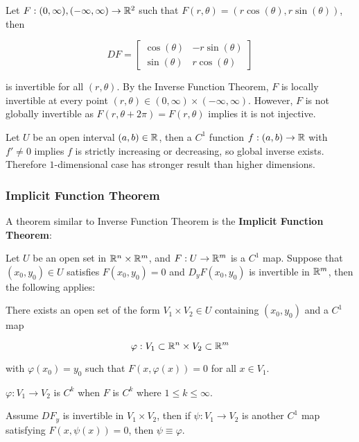 \documentclass[a4paper,12pt]{article}
\begin{document}
\begin{exm}
  Let $F:(0,\infty),(-\infty,\infty)\to\mathbb{R}^{2}$ such that $F(r,\theta)=(r\cos(\theta),r\sin(\theta))$, then
  
  $$DF=\begin{bmatrix}
    \cos(\theta) & -r\sin(\theta)\\
    \sin(\theta) & r\cos(\theta)
  \end{bmatrix}$$\s

  is invertible for all $(r,\theta)$. By the Inverse Function Theorem, $F$ is locally invertible at every point $(r,\theta)\in(0,\infty)\times(-\infty,\infty)$. However, $F$ is not globally invertible as $F(r,\theta+2\pi)=F(r,\theta)$ implies it is not injective.
\end{exm}\n

\begin{exm}
  Let $U$ be an open interval $(a,b)\in\mathbb{R}$, then a $C^{1}$ function $f:(a,b)\to\mathbb{R}$ with $f'\neq 0$ implies $f$ is strictly increasing or decreasing, so global inverse exists. Therefore $1$-dimensional case has stronger result than higher dimensions.
\end{exm}

\subsubsection{Implicit Function Theorem}
A theorem similar to Inverse Function Theorem is the \textbf{Implicit Function Theorem}:\n

\begin{thm}
  Let $U$ be an open set in $\mathbb{R}^{n}\times\mathbb{R}^{m}$, and $F:U\to\mathbb{R}^{m}$ is a $C^{1}$ map. Suppose that $(x_{0},y_{0})\in U$ satisfies $F(x_{0},y_{0})=0$ and $D_{y}F(x_{0},y_{0})$ is invertible in $\mathbb{R}^{m}$, then the following applies:

  \begin{alist}
    \item There exists an open set of the form $V_{1}\times V_{2}\in U$ containing $(x_{0},y_{0})$ and a $C^{1}$ map
    
    $$\varphi:V_{1}\subset\mathbb{R}^{n}\times V_{2}\subset\mathbb{R}^{m}$$\s
    
    with $\varphi(x_{0})=y_{0}$ such that $F(x,\varphi(x))=0$ for all $x\in V_{1}$.
    \item $\varphi:V_{1}\to V_{2}$ is $C^{k}$ when $F$ is $C^{k}$ where $1\leq k\leq\infty$.
    \item Assume $DF_{y}$ is invertible in $V_{1}\times V_{2}$, then if $\psi:V_{1}\to V_{2}$ is another $C^{1}$ map satisfying $F(x,\psi(x))=0$, then $\psi\equiv\varphi$.
  \end{alist}
\end{thm}\n
\end{document}
